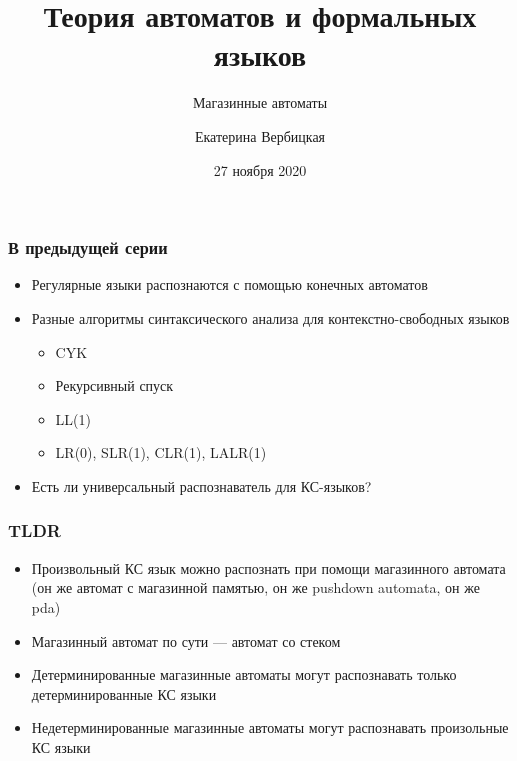 \documentclass[dvipsnames]{beamer}
\title[]{Теория автоматов и формальных языков}
\subtitle[]{Магазинные автоматы}
\institute[]{
Санкт-Петербургский государственный электротехнический университет <<ЛЭТИ>>\\
}
\author[]{Екатерина Вербицкая}
\date{27 ноября 2020}
\begin{document}
{
  \begin{frame}
    \titlepage
  \end{frame}
}

\begin{frame}[fragile]
  \frametitle{В предыдущей серии}
  \begin{itemize}
    \item Регулярные языки распознаются с помощью конечных автоматов
    \item Разные алгоритмы синтаксического анализа для контекстно-свободных языков
    \begin{itemize}
    	\item CYK
    	\item Рекурсивный спуск
    	\item LL(1)
    	\item LR(0), SLR(1), CLR(1), LALR(1)
    \end{itemize}
    \item Есть ли универсальный распознаватель для КС-языков?
  \end{itemize}
\end{frame}

\begin{frame}[fragile]
  \frametitle{TLDR}
  \begin{itemize}
  	\item Произвольный КС язык можно распознать при помощи магазинного автомата (он же автомат с магазинной памятью, он же pushdown automata, он же pda)
  	\item Магазинный автомат по сути --- автомат со стеком
  	\item Детерминированные магазинные автоматы могут распознавать только детерминированные КС языки
  	\item Недетерминированные магазинные автоматы могут распознавать произольные КС языки
  \end{itemize}
\end{frame}
\end{document}

